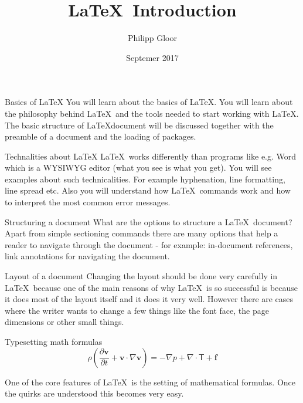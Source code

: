 \documentclass[10pt, a4paper]{beamer} %
\title{\LaTeX\ Introduction}
\author{Philipp Gloor\inst{1}}
\institute[University of Zurich] %
{
  \inst{1}%
  philipp.gloor@gmail.com
}
\date{Septemer 2017} %
\begin{document}
    \begin{frame}
    \titlepage
    \end{frame}
    \begin{frame}{Basics of \LaTeX}
        You will learn about the basics of \LaTeX. You will learn about the philosophy behind \LaTeX\ and the tools needed to start working with \LaTeX. The basic structure of \LaTeX document will be discussed together with the preamble of a document and the loading of packages.
    \end{frame}
    

    

    \begin{frame}{Technalities about \LaTeX}
    \LaTeX\ works differently than programs like e.g. Word which is a WYSIWYG editor (what you see is what you get). You will see examples about such technicalities. For example hyphenation, line formatting, line spread etc. Also you will understand how \LaTeX\ commands work and how to interpret the most common error messages.
    \end{frame}

    \begin{frame}{Structuring a document}
    What are the options to structure a \LaTeX\ document? Apart from simple sectioning commands there are many options that help a reader to navigate through the document - for example: in-document references, link annotations for navigating the document.
    \end{frame}

    \begin{frame}{Layout of a document}
    Changing the layout should be done very carefully in \LaTeX\ because one of the main reasons of why \LaTeX\ is so successful is because it does most of the layout itself and it does it very well. However there are cases where the writer wants to change a few things like the font face, the page dimensions or other small things.
    \end{frame}

    \begin{frame}[t]{Typesetting math formulas}
    \vspace{1cm}
    \[ \rho\left( \frac{\partial \mathbf{v}}{\partial t} + \mathbf{v}\cdot\nabla\mathbf{v}\right) = -\nabla p + \nabla\cdot\mathsf{T}+\mathbf{f} \]

    \vspace*{\fill}
    One of the core features of \LaTeX\ is the setting of mathematical formulas. Once the quirks are understood this becomes very easy.
    \vspace*{\fill}
    \end{frame}
    
\end{document}
